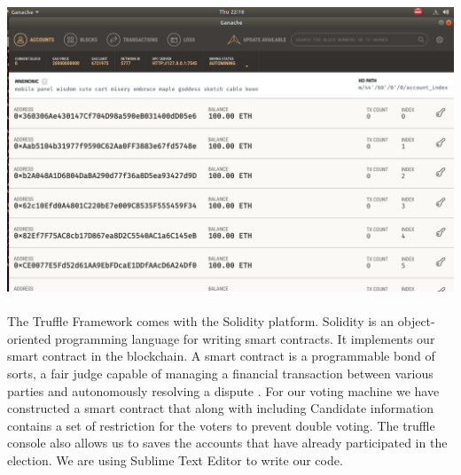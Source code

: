 \documentclass{report}
\begin{document}
\\
\\
\includegraphics[scale=0.45]{ganache1.png}
\\
\\
The Truffle Framework comes with the Solidity platform. Solidity is an object-oriented programming language for writing smart contracts. It implements our smart contract in the blockchain. A smart contract is a programmable bond of sorts, a fair judge capable of managing a financial transaction between various parties and autonomously resolving a dispute \cite{dannen2017introducing}. For our voting machine we have constructed a smart contract that along with including Candidate information contains a set of restriction for the voters to prevent double voting. The truffle console also allows us to saves the accounts that have already participated in the election. We are using Sublime Text Editor to write our code.
\\
\\
\end{document}
